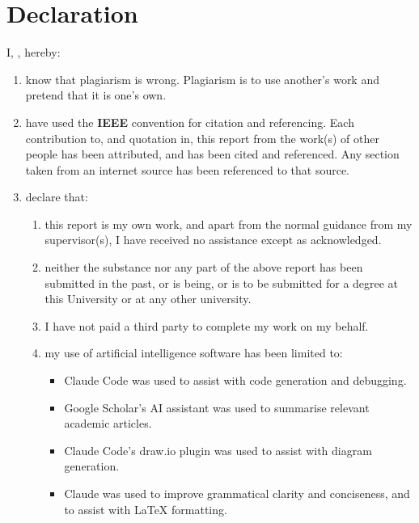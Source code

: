 \chapter{Declaration}
\label{ch:decl}

I, \textbf{\auth}, hereby:

\begin{enumerate}[label=\arabic*.]
    \item know that plagiarism is wrong. Plagiarism is to use another’s work and pretend that it is one’s own.

    \item have used the {\bf IEEE} convention for citation and referencing. Each contribution to, and quotation in, this report from the work(s) of other people has been attributed, and has been cited and referenced. Any section taken from an internet source has been referenced to that source.

    \item declare that: 
    \begin{enumerate}[label=\alph*.]
        \item this report is my own work, and apart from the normal guidance from my supervisor(s), I have received no assistance except as acknowledged.
        
        \item neither the substance nor any part of the above report has been submitted in the past, or is being, or is to be submitted for a degree at this University or at any other university.
        
        \item I have not paid a third party to complete my work on my behalf.
        
        \item my use of artificial intelligence software has been limited to:
        
        \vspace{1em}
     \begin{itemize}
    \item Claude Code was used to assist with code generation and debugging.
    \item Google Scholar's AI assistant was used to summarise relevant academic articles.
    \item Claude Code's draw.io plugin was used to assist with diagram generation.
    \item Claude was used to improve grammatical clarity and conciseness, and to assist with LaTeX formatting.
    \end{itemize}
        \vspace{1em}
    \end{enumerate}


\end{enumerate}
